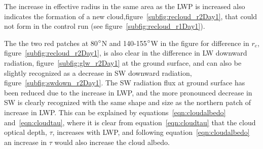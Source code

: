 The increase in effective radius in the same area as the LWP is increased also indicates the formation of a new cloud,figure~\ref{subfig:recloud_r2Day1}, that could not form in the control run (see figure~\ref{subfig:recloud_r1Day1}).


The the two red patches at 80$\degree$N and 140-155$\degree$W in the figure for difference in $r_e$, figure~\ref{subfig:recloud_r2Day1}, is also clear in the difference in LW downward radiation, figure~\ref{subfig:glw_r2Day1} at the ground surface, and can also be slightly recognized as a decrease in SW downward radiation, figure~\ref{subfig:swdown_r2Day1}. The SW radiation flux at ground surface has been reduced due to the increase in LWP, and the more pronounced decrease in SW is clearly recognized with the same shape and size as the northern patch of increase in LWP. This can be explained by equations~\ref{eqn:cloudalbedo} and~\ref{eqn:cloudtau}, where it is clear from equation~\ref{eqn:cloudtau} that the cloud optical depth, $\tau$, increases with LWP, and following equation~\ref{eqn:cloudalbedo} an increase in $\tau$ would also increase the cloud albedo.

